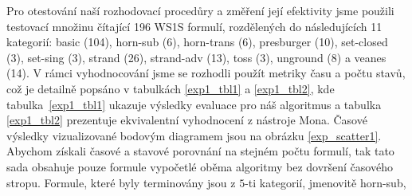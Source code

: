 Pro otestování naší rozhodovací procedůry a změření její efektivity jsme použili testovací množinu čítající 196 WS1S formulí, rozdělených do následujících 11 kategorií: basic (104), horn-sub (6), horn-trans (6), presburger (10), set-closed (3), set-sing (3), strand (26), strand-adv (13), toss (3), unground (8) a veanes (14). V rámci vyhodnocování jsme se rozhodli použít metriky času a počtu stavů, což je detailně popsáno v tabulkách \ref{exp1_tbl1} a \ref{exp1_tbl2}, kde tabulka~\ref{exp1_tbl1} ukazuje výsledky evaluace pro náš  algoritmus a tabulka \ref{exp1_tbl2} prezentuje ekvivalentní vyhodnocení z nástroje Mona. Časové výsledky vizualizované bodovým diagramem jsou na obrázku \ref{exp_scatter1}. Abychom získali časové a stavové porovnání na stejném počtu formulí, tak tato sada obsahuje pouze formule vypočetlé oběma algoritmy bez dovršení časového stropu. Formule, které byly terminovány jsou z $5$-ti kategorií, jmenovitě horn-sub,

